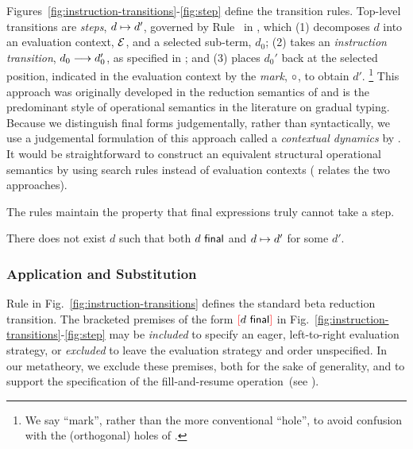 Figures~\ref{fig:instruction-transitions}-\ref{fig:step} define the transition rules.
%
Top-level transitions are \emph{steps}, $d \mapsto d'$, governed by Rule~ in , which
%
(1) decomposes $d$ into an evaluation context, $\mathcal{E}$, and a selected sub-term, $d_0$;
%
(2) takes an \emph{instruction transition}, $d_0 \longrightarrow d_0'$, as specified in ;
%
and (3) places $d_0'$ back at the selected position, indicated in
the evaluation context by the \emph{mark}, $\circ$, to obtain $d'$.%
\footnote{
        We say ``mark'', rather than the more conventional ``hole'', to avoid confusion with the (orthogonal) holes of \HazelnutLive.
        }
%
This approach was originally developed in the reduction semantics of \citet{DBLP:journals/tcs/FelleisenH92} and is the predominant style of operational semantics in the literature on gradual typing.
Because we distinguish final forms judgementally, rather than syntactically, we use a judgemental formulation of this approach called a \emph{contextual dynamics} by \citet{pfpl}.
It would be straightforward to construct an equivalent structural operational semantics \cite{DBLP:journals/jlp/Plotkin04a} by using search rules instead of evaluation contexts (\citet{pfpl} relates the two approaches).

The rules maintain the property that final expressions truly cannot take a step.%
\begin{thm}[Finality] There does not exist $d$ such that both $d~\mathsf{final}$ and $d \mapsto d'$ for some $d'$.
\end{thm}


\subsubsection{Application and Substitution}
%
Rule  in Fig.~\ref{fig:instruction-transitions} defines the
standard beta reduction transition.
%
The bracketed premises of the form ${\textcolor{red}[}d~\mathsf{final}{\textcolor{red}]}$ in
Fig.~\ref{fig:instruction-transitions}-\ref{fig:step} may be \emph{included}
to specify an eager, left-to-right evaluation strategy, or \emph{excluded} to
leave the evaluation strategy and order unspecified.
%
In our metatheory, we exclude these premises, both for
the sake of generality, and to support the specification of the fill-and-resume operation~(see ).


